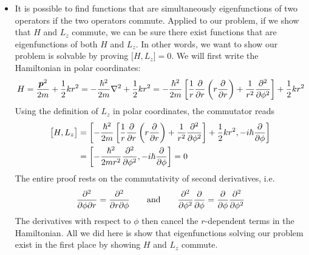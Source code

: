 \documentclass[11pt, a4paper]{article}
\newcommand{\eqtext}[1]{\qquad \text{#1} \qquad}
\renewcommand{\vec}[1]{\bm{#1}} %
\begin{document}
\begin{itemize}
	\item It is possible to find functions that are simultaneously eigenfunctions of two operators if the two operators commute. Applied to our problem, if we show that $ H $ and $ L_{z} $ commute, we can be sure there exist functions that are eigenfunctions of both $ H $ and $ L_{z} $. In other words, we want to show our problem is solvable by proving $ \big[H, L_{z}\big] = 0 $. We will first write the Hamiltonian in polar coordinates:
	\begin{equation*}
		H = \frac{\vec{p}^{2}}{2m} + \frac{1}{2}kr^{2} = -\frac{\hbar^{2}}{2m} \laplacian + \frac{1}{2}kr^{2} = -\frac{\hbar^{2}}{2m}\left [\frac{1}{r}\pdv{r}\left(r\pdv{r}\right) + \frac{1}{r^{2}}\pdv[2]{}{\phi}\right ] + \frac{1}{2}kr^{2}
	\end{equation*}
	Using the definition of $ L_{z} $ in polar coordinates, the commutator reads
	\begin{align*}
		\big[H, L_{z}\big] &= \left[ -\frac{\hbar^{2}}{2m}\left [\frac{1}{r}\pdv{r}\left(r\pdv{r}\right) + \frac{1}{r^{2}}\pdv[2]{}{\phi}\right ] + \frac{1}{2}kr^{2}, -i\hbar \pdv{\phi}\right]\\
		&=\left[-\frac{\hbar^{2}}{2mr^{2}}\pdv[2]{}{\phi}, -i\hbar \pdv{\phi}\right] = 0
	\end{align*}
	The entire proof rests on the commutativity of second derivatives, i.e. 
	\begin{equation*}
		\pdv{}{\phi}{r} = \pdv{}{r}{\phi} \eqtext{and} \pdv[2]{}{\phi} \pdv{\phi} =  \pdv{\phi} \pdv[2]{}{\phi}
	\end{equation*} 
	The derivatives with respect to $ \phi $ then cancel the $ r $-dependent terms in the Hamiltonian. All we did here is show that eigenfunctions solving our problem exist in the first place by showing $ H $ and $ L_{z} $ commute.
	

\end{itemize}
\end{document}
